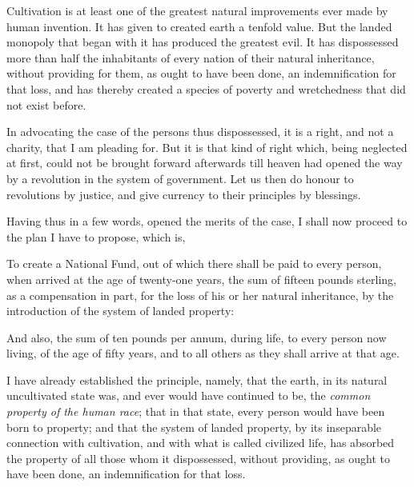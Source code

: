 Cultivation is at least one of the greatest natural improvements ever made by human invention. It has given to created earth a tenfold value. But the landed monopoly that began with it has produced the greatest evil. It has dispossessed more than half the inhabitants of every nation of their natural inheritance, without providing for them, as ought to have been done, an indemnification for that loss, and has thereby created a species of poverty and wretchedness that did not exist before.\par

In advocating the case of the persons thus dispossessed, it is a right, and not a charity, that I am pleading for. But it is that kind of right which, being neglected at first, could not be brought forward afterwards till heaven had opened the way by a revolution in the system of government. Let us then do honour to revolutions by justice, and give currency to their principles by blessings.\par

Having thus in a few words, opened the merits of the case, I shall now proceed to the plan I have to propose, which is,\par

To create a National Fund, out of which there shall be paid to every person, when arrived at the age of twenty-one years, the sum of fifteen pounds sterling, as a compensation in part, for the loss of his or her natural inheritance, by the introduction of the system of landed property:\par

And also, the sum of ten pounds per annum, during life, to every person now living, of the age of fifty years, and to all others as they shall arrive at that age.\par


I have already established the principle, namely, that the earth, in its natural uncultivated state was, and ever would have continued to be, the \textit{common property of the human race}; that in that state, every person would have been born to property; and that the system of landed property, by its inseparable connection with cultivation, and with what is called civilized life, has absorbed the property of all those whom it dispossessed, without providing, as ought to have been done, an indemnification for that loss.\par

